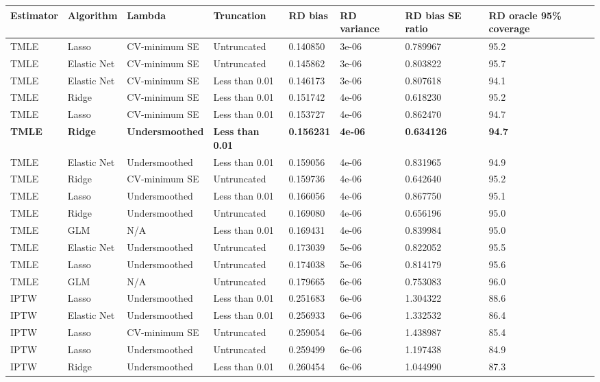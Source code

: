 
\begin{longtable}[l]{llllllll}
\toprule
Estimator & Algorithm & Lambda & Truncation & RD bias & RD variance & RD bias SE ratio & RD oracle 95\% coverage\\
\midrule
TMLE & Lasso & CV-minimum SE & Untruncated & 0.140850 & 3e-06 & 0.789967 & 95.2\\
TMLE & Elastic Net & CV-minimum SE & Untruncated & 0.145862 & 3e-06 & 0.803822 & 95.7\\
TMLE & Elastic Net & CV-minimum SE & Less than 0.01 & 0.146173 & 3e-06 & 0.807618 & 94.1\\
TMLE & Ridge & CV-minimum SE & Less than 0.01 & 0.151742 & 4e-06 & 0.618230 & 95.2\\
TMLE & Lasso & CV-minimum SE & Less than 0.01 & 0.153727 & 4e-06 & 0.862470 & 94.7\\
\midrule
\textbf{TMLE} & \textbf{Ridge} & \textbf{Undersmoothed} & \textbf{Less than 0.01} & \textbf{0.156231} & \textbf{4e-06} & \textbf{0.634126} & \textbf{94.7}\\
\midrule
TMLE & Elastic Net & Undersmoothed & Less than 0.01 & 0.159056 & 4e-06 & 0.831965 & 94.9\\
TMLE & Ridge & CV-minimum SE & Untruncated & 0.159736 & 4e-06 & 0.642640 & 95.2\\
TMLE & Lasso & Undersmoothed & Less than 0.01 & 0.166056 & 4e-06 & 0.867750 & 95.1\\
TMLE & Ridge & Undersmoothed & Untruncated & 0.169080 & 4e-06 & 0.656196 & 95.0\\
TMLE & GLM & N/A & Less than 0.01 & 0.169431 & 4e-06 & 0.839984 & 95.0\\
TMLE & Elastic Net & Undersmoothed & Untruncated & 0.173039 & 5e-06 & 0.822052 & 95.5\\
TMLE & Lasso & Undersmoothed & Untruncated & 0.174038 & 5e-06 & 0.814179 & 95.6\\
TMLE & GLM & N/A & Untruncated & 0.179665 & 6e-06 & 0.753083 & 96.0\\
IPTW & Lasso & Undersmoothed & Less than 0.01 & 0.251683 & 6e-06 & 1.304322 & 88.6\\
IPTW & Elastic Net & Undersmoothed & Less than 0.01 & 0.256933 & 6e-06 & 1.332532 & 86.4\\
IPTW & Lasso & CV-minimum SE & Untruncated & 0.259054 & 6e-06 & 1.438987 & 85.4\\
IPTW & Lasso & Undersmoothed & Untruncated & 0.259499 & 6e-06 & 1.197438 & 84.9\\
IPTW & Ridge & Undersmoothed & Less than 0.01 & 0.260454 & 6e-06 & 1.044990 & 87.3\\

\end{longtable}
